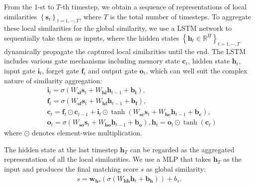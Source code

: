 \documentclass[10pt,twocolumn,letterpaper]{article}
\begin{document}
From the 1-st to $T$-th timestep, we obtain a sequence of representations
of local similarities $\left\{ \textbf{s}_t \right\}_{t=1,\cdots,T}$,
where $T$ is the total number of timesteps.
To aggregate these local similarities for the global similarity,
we use a LSTM network to sequentially take them as inputs,
where the hidden states
$\left\{ \textbf{h}_t \in {\mathbb{R}^{H}} \right\}_{t=1,\cdots,T}$
dynamically propagate the captured local similarities
until the end.
The LSTM includes various gate mechanisms including
memory state ${\textbf{c}_t}$, hidden state ${\textbf{h}_t}$,
input gate $\textbf{i}_{t}$, forget gate $\textbf{f}_{t}$
and output gate $\textbf{o}_{t}$,
which can well suit the complex nature of similarity aggregation:
\begin{equation} \label{eqn:e5}
\begin{aligned}
&{\textbf{i}_t} = \sigma ({W_{\textbf{s}\textbf{i}}}{\textbf{s}_t} + {W_{\textbf{h}\textbf{i}}}{\textbf{h}_{t - 1}} + {\textbf{b}_\textbf{i}}), \\
&{\textbf{f}_t} = \sigma ({{W}_{\textbf{s}\textbf{f}}}{\textbf{s}_t} + {W_{\textbf{h}\textbf{f}}}{\textbf{h}_{t - 1}} + {\textbf{b}_\textbf{f}}),\\
&{\textbf{c}_t} = {\textbf{f}_t}\odot{\textbf{c}_{t - 1}} + {\textbf{i}_t}\odot\tanh ({W_{\textbf{s}\textbf{c}}}{\textbf{s}_t} + {W_{\textbf{h}\textbf{c}}}{\textbf{h}_{t - 1}} + {\textbf{b}_\textbf{c}}),\\
&{\textbf{o}_t} = \sigma ({W_{\textbf{s}\textbf{o}}}{\textbf{s}_t} + {W_{\textbf{h}\textbf{o}}}{\textbf{h}_{t - 1}} + {\textbf{b}_\textbf{o}}),
{\textbf{h}_t} = {\textbf{o}_t}\odot\tanh ({\textbf{c}_t})
\end{aligned}
\end{equation}
where $\odot$ denotes element-wise multiplication.

The hidden state at the last timestep ${\textbf{h}_{T}}$
can be regarded as the aggregated representation of all the local similarities.
We use a MLP that takes ${\textbf{h}_{T}}$ as the input
and produces the final matching score $s$ as global similarity:
\begin{equation} \label{eqn:e6}
\begin{aligned}
s = {\textbf{w}_{\textbf{h}s}}\left( {\sigma \left( {{{W}_{\textbf{hh}}}{\textbf{h}_t} + {\textbf{b}_\textbf{h}}} \right)} \right) + {b_s}.
\end{aligned}
\end{equation}
\end{document}
